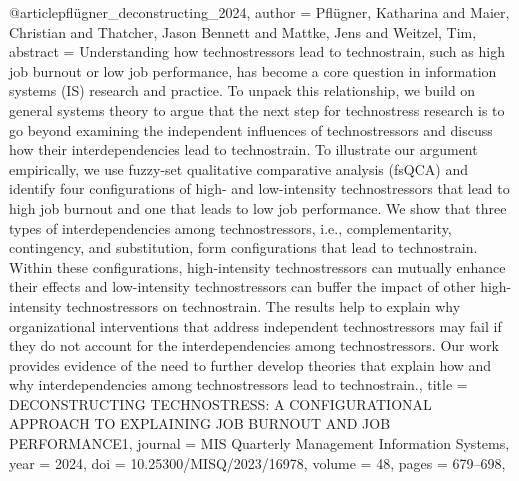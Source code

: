 @article{pflügner_deconstructing_2024,
  author = {Pflügner, Katharina and Maier, Christian and Thatcher, Jason Bennett and Mattke, Jens and Weitzel, Tim},
  abstract = {Understanding how technostressors lead to technostrain, such as high job burnout or low job performance, has become a core question in information systems (IS) research and practice. To unpack this relationship, we build on general systems theory to argue that the next step for technostress research is to go beyond examining the independent influences of technostressors and discuss how their interdependencies lead to technostrain. To illustrate our argument empirically, we use fuzzy-set qualitative comparative analysis (fsQCA) and identify four configurations of high- and low-intensity technostressors that lead to high job burnout and one that leads to low job performance. We show that three types of interdependencies among technostressors, i.e., complementarity, contingency, and substitution, form configurations that lead to technostrain. Within these configurations, high-intensity technostressors can mutually enhance their effects and low-intensity technostressors can buffer the impact of other high-intensity technostressors on technostrain. The results help to explain why organizational interventions that address independent technostressors may fail if they do not account for the interdependencies among technostressors. Our work provides evidence of the need to further develop theories that explain how and why interdependencies among technostressors lead to technostrain.},
  title = {{DECONSTRUCTING} {TECHNOSTRESS}: {A} {CONFIGURATIONAL} {APPROACH} {TO} {EXPLAINING} {JOB} {BURNOUT} {AND} {JOB} {PERFORMANCE1}},
  journal = {MIS Quarterly Management Information Systems},
  year = {2024},
  doi = {10.25300/MISQ/2023/16978},
  volume = {48},
  pages = {679--698},
}

